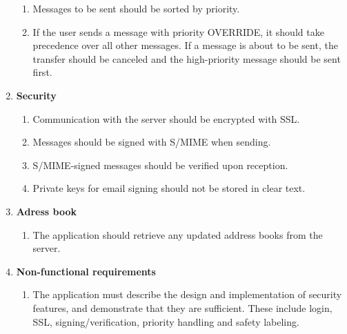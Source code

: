 \begin{enumerate}
\begin{enumerate}
\item{}Messages to be sent should be sorted by priority.
\item{}If the user sends a message with priority OVERRIDE, it should take precedence over all other messages. If a message is about to be sent, the transfer should be canceled and the high-priority message should be sent first.
\end{enumerate}
\item{}\textbf{Security}
\begin{enumerate}
\item{}Communication with the server should be encrypted with SSL.
\item{}Messages should be signed with S/MIME when sending.
\item{}S/MIME-signed messages should be verified upon reception.
\item{}Private keys for email signing should not be stored in clear text.
\end{enumerate}

\newpage

\item{}\textbf{Adress book}
\begin{enumerate}
\item{}The application should retrieve any updated address books from the server.
\end{enumerate}
\item{}\textbf{Non-functional requirements}
\begin{enumerate}
\item{}The application must describe the design and implementation of security features, and demonstrate that they are sufficient. These include login, SSL, signing/verification, priority handling and safety labeling.
\end{enumerate}
\end{enumerate}